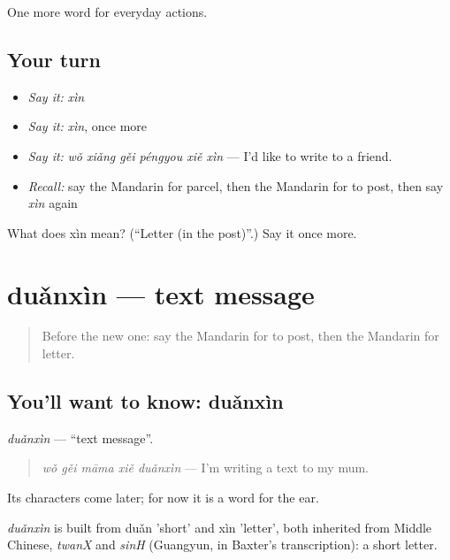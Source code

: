 \begin{grammarlens}[title={What you've built}]
One more word for everyday actions.
\end{grammarlens}

\subsection*{Your turn}
\begin{itemize}
\raggedright
  \item \emph{Say it:} \emph{xìn}
  \item \emph{Say it:} \emph{xìn}, once more
  \item \emph{Say it:} \emph{wǒ xiǎng gěi péngyou xiě xìn} — I'd like to write to a friend.
  \item \emph{Recall:} say the Mandarin for parcel, then the Mandarin for to post, then say \emph{xìn} again
\end{itemize}

\begin{tcolorbox}[breakable,colback=teal!4,colframe=teal!35!black,title={Before you move on}]
What does xìn mean? (\textquotedblleft{}Letter (in the post)\textquotedblright{}.) Say it once more.
\end{tcolorbox}
\section[duǎnxìn]{duǎnxìn — text message}

\label{lesson:ZH-C118-duanxin}



\begin{quote}
Before the new one: say the Mandarin for to post, then the Mandarin for letter.
\end{quote}

\subsection*{You'll want to know: duǎnxìn}
\emph{duǎnxìn} — \textquotedblleft{}text message\textquotedblright{}.

\begin{quote}
\emph{wǒ gěi māma xiě duǎnxìn} — I'm writing a text to my mum.
\end{quote}

Its characters come later; for now it is a word for the ear.

\begin{cousinweb}
\emph{duǎnxìn} is built from duǎn 'short' and xìn 'letter', both inherited from Middle Chinese, \emph{twanX} and \emph{sinH} (Guangyun, in Baxter's transcription): a short letter.
\end{cousinweb}

